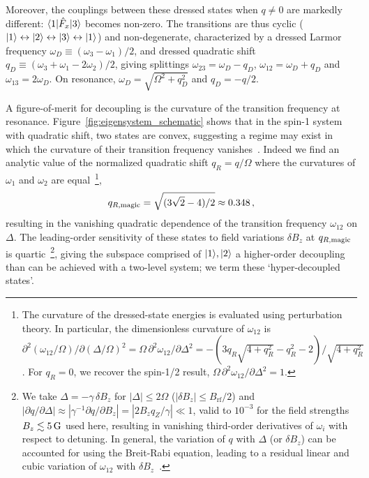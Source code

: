 \documentclass[aps,prl,reprint,superscriptaddress,floatfix]{revtex4-1}
\begin{document}
Moreover, the couplings between these dressed states when $q \neq 0$ are markedly different:
$\langle 1 \vert  \hat{F}_x \vert 3 \rangle $ becomes non-zero.
The transitions are thus cyclic ($\vert 1 \rangle  \leftrightarrow \vert 2 \rangle  \leftrightarrow \vert 3 \rangle  \leftrightarrow \vert 1 \rangle $) and non-degenerate, characterized by a dressed Larmor frequency $\omega_D\equiv(\omega_3-\omega_1)/2$, and dressed quadratic shift $q_D \equiv (\omega_3 + \omega_1 -2\omega_2)/2$, giving splittings $\omega_{23}=\omega_D-q_D$, $\omega_{12}=\omega_D+q_D$ and $\omega_{13}=2\omega_D$.
On resonance, $\omega_D=\sqrt{\Omega^2+q_D^2}$ and $q_D = -q/2$.

A figure-of-merit for decoupling is the curvature of the transition frequency at resonance.
Figure~\ref{fig:eigensystem_schematic} shows that in the spin-1 system with quadratic shift, two states are convex, suggesting a regime may exist in which the curvature of their transition frequency vanishes~\cite{rabl_strong_2009,*xu_coherence-protected_2012}.
Indeed we find an analytic value of the normalized quadratic shift $q_R=q/\Omega$ where the curvatures of $\omega_1$ and $\omega_2$ are equal~\footnote{
  The curvature of the dressed-state energies is evaluated using perturbation theory. In particular, the dimensionless curvature of $\omega_{12}$ is $\partial^2(\omega_{12}/\Omega)/\partial(\Delta/\Omega)^2 = \Omega \, \partial^2\omega_{12}/\partial \Delta^2 = -(3 q_R \sqrt{4 + q_R^2} - q_R^2 - 2)/\sqrt{4 + q_R^2}$. For $q_R = 0$, we recover the spin-1/2 result, $\Omega\, \partial^2\omega_{12}/\partial \Delta^2 = 1$.},
\begin{align}
\label{eq:qRmagic}
    q_{R,\text{magic}} = \sqrt{(3\sqrt{2} - 4)/2} \approx 0.348 \, ,
\end{align}
resulting in the vanishing quadratic dependence of the transition frequency $\omega_{12}$ on $\Delta$.
The leading-order sensitivity of these states to field variations $\delta B_z$ at $q_{R,\text{magic}}$ is quartic~\footnote{
    We take $\Delta = -\gamma \, \delta B_z$ for $|\Delta | \leq 2\Omega$ ($| \delta B_z | \leq B_{\text{rf}}/2$) and $| \partial q / \partial \Delta | \approx | \gamma^{-1} \partial q / \partial B_z | = |2 B_z q_Z / \gamma| \ll 1$, valid to $10^{-3}$ for the field strengths $B_z \lesssim \unit[5]{G}$ used here, resulting in vanishing third-order derivatives of $\omega_i$ with respect to detuning. 
    In general, the variation of $q$ with $\Delta$ (or $\delta B_z$) can be accounted for using the Breit-Rabi equation, leading to a residual linear and cubic variation of $\omega_{12}$ with $\delta B_z$~\cite{trypogeorgos_synthetic_2017}.},
giving the subspace comprised of ${\vert 1 \rangle ,\vert 2 \rangle }$ a higher-order decoupling than can be achieved with a two-level system; we term these `hyper-decoupled states'.
\end{document}
